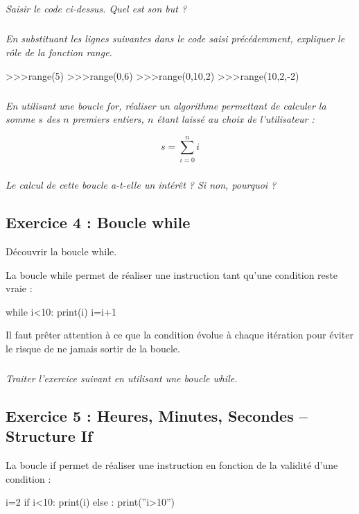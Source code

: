 \documentclass[10pt]{article}
\begin{document}
\subparagraph{}
\textit{Saisir le code ci-dessus. Quel est son but ?}


\subparagraph{}
\textit{En substituant les lignes suivantes dans le code saisi précédemment, expliquer le rôle de la fonction \textsf{range}. }

\begin{py}
\begin{python}
>>>range(5)
>>>range(0,6)
>>>range(0,10,2)
>>>range(10,2,-2)
\end{python}
\end{py}


\subparagraph{}
\textit{En utilisant une boucle \textsf{for}, réaliser un algorithme permettant de calculer la somme $s$ des $n$ premiers entiers, $n$ étant laissé au choix de l’utilisateur :}

$$
s = \sum\limits_{i=0}^{n} i
$$

\subparagraph{}
\textit{Le calcul de cette boucle a-t-elle un intérêt ? Si non, pourquoi ?}


\subsection*{Exercice 4 : Boucle while}
\setcounter{subparagraph}{0}
\begin{obj}
Découvrir la boucle \textsf{while}.
\end{obj}

\begin{py}
La boucle \textsf{while} permet de réaliser une instruction tant qu’une condition reste vraie :
\begin{python}
while i<10:
    print(i)
    i=i+1
\end{python}
\end{py}

\begin{warn}
Il faut prêter attention à ce que la condition évolue à chaque itération pour éviter le risque de ne jamais sortir de la boucle.
\end{warn}

\subparagraph*{}
\textit{Traiter l'exercice suivant en utilisant une boucle \textsf{while}.}

\subsection*{Exercice 5 : Heures, Minutes, Secondes -- Structure \textsf{If}}
\setcounter{subparagraph}{0}
\begin{py}
La boucle \textsf{if} permet de réaliser une instruction en fonction de la validité d’une condition :
\begin{python}
i=2
if i<10:
    print(i)
else :
    print(''i>10'')
\end{python}
\end{py}
\end{document}
